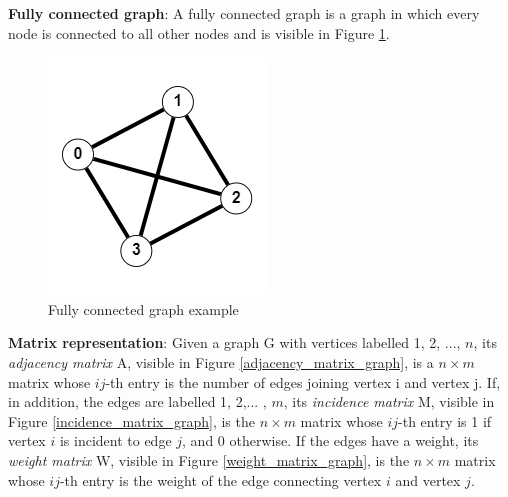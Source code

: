 \documentclass[\main/main.tex]{subfiles}
\begin{document}
\textbf{Fully connected graph}:
A fully connected graph is a graph in which every node is connected to all other nodes \cite{Siu1998IntroductionTG} and is visible in Figure \ref{fig:fully_connected_graph_example}. 
\begin{center}
    \begin{figure}[H]
    \centering
    \includegraphics[scale=1]{images/methods/fully_connected_graph_example.png}
    \caption{Fully connected graph example}
    \label{fig:fully_connected_graph_example}
\end{figure}
\end{center}
\textbf{Matrix representation}: 
Given a graph G with vertices labelled {1, 2, ..., $n$}, its \emph{adjacency matrix} A, visible in Figure \ref{adjacency_matrix_graph}, is a $n \times m$ matrix whose $ij$-th entry is the number of edges joining vertex i and vertex j. If, in addition, the edges are labelled {1, 2,... , $m$}, its \emph{incidence matrix} M, visible in Figure \ref{incidence_matrix_graph}, is the $n \times m$ matrix whose $ij$-th entry is 1 if vertex $i$ is incident to edge $j$, and 0 otherwise. If the edges have a weight, its \emph{weight matrix} W, visible in Figure \ref{weight_matrix_graph}, is the $n \times m$ matrix whose $ij$-th entry is the weight of the edge connecting vertex $i$ and vertex $j$.
\end{document}
